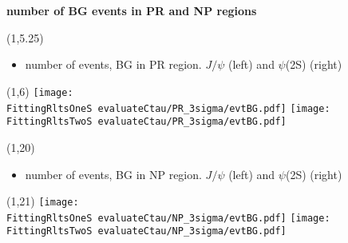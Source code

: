 \documentclass[11pt,slidescentered,red,compress,handout,hyperref={bookmarks=true},mathseriftable]{beamer}
\newcommand{\FittingRltsOneS}{../Psi1S/Fit/parameter/}
\newcommand{\FittingRltsTwoS}{../Psi2S/Fit/parameter/}
\begin{document}
\section{}
\begin{frame}[t]{\small \bf number of BG events in PR and NP regions}{}
\begin{textblock}{48}(1,5.25)
\begin{itemize}
\scriptsize \item number of events, BG in PR region. $J/\psi$ (left) and $\psi$(2S) (right)
\end{itemize}
\end{textblock}
\begin{textblock}{48}(1,6)
\hspace*{10pt} \texttt{[image: \\FittingRltsOneS evaluateCtau/PR\_3sigma/evtBG.pdf]}
\hspace*{10pt} \texttt{[image: \\FittingRltsTwoS evaluateCtau/PR\_3sigma/evtBG.pdf]}
\end{textblock}

\begin{textblock}{48}(1,20)
\begin{itemize}
\scriptsize \item  number of events, BG in NP region. $J/\psi$ (left) and $\psi$(2S) (right)
\end{itemize}
\end{textblock}
\begin{textblock}{48}(1,21)
\hspace*{10pt} \texttt{[image: \\FittingRltsOneS evaluateCtau/NP\_3sigma/evtBG.pdf]}
\hspace*{10pt} \texttt{[image: \\FittingRltsTwoS evaluateCtau/NP\_3sigma/evtBG.pdf]}
\end{textblock}

\end{frame}
\end{document}
